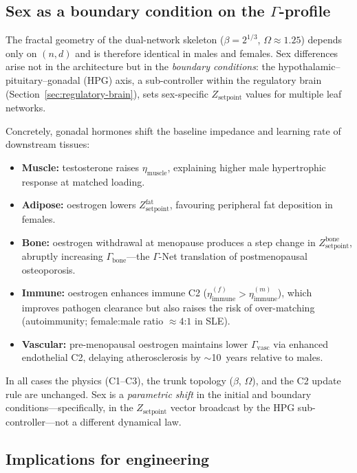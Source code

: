 \documentclass[aps,pre,twocolumn,superscriptaddress,floatfix]{revtex4-2}
\begin{document}
\subsection{Sex as a boundary condition on the
$\Gamma$-profile}

The fractal geometry of the dual-network skeleton
($\beta = 2^{1/3}$, $\Omega \approx 1.25$) depends only
on $(n, d)$ and is therefore identical in males and females.
Sex differences arise not in the architecture but in the
\emph{boundary conditions}: the hypothalamic--pituitary--gonadal
(HPG) axis, a sub-controller within the regulatory brain
(Section~\ref{sec:regulatory-brain}), sets sex-specific
$Z_{\text{setpoint}}$ values for multiple leaf networks.

Concretely, gonadal hormones shift the baseline impedance
and learning rate of downstream tissues:
\begin{itemize}
  \item \textbf{Muscle:} testosterone raises
    $\eta_{\text{muscle}}$, explaining higher male
    hypertrophic response at matched loading.
  \item \textbf{Adipose:} oestrogen lowers
    $Z_{\text{setpoint}}^{\text{fat}}$, favouring
    peripheral fat deposition in females.
  \item \textbf{Bone:} oestrogen withdrawal at menopause
    produces a step change in $Z_{\text{setpoint}}^{\text{bone}}$,
    abruptly increasing $\Gamma_{\text{bone}}$---the
    $\Gamma$-Net translation of postmenopausal osteoporosis.
  \item \textbf{Immune:} oestrogen enhances immune C2
    ($\eta_{\text{immune}}^{(f)} > \eta_{\text{immune}}^{(m)}$),
    which improves pathogen clearance but also raises the
    risk of over-matching (autoimmunity; female:male ratio
    $\approx 4$:$1$ in SLE).
  \item \textbf{Vascular:} pre-menopausal oestrogen
    maintains lower $\Gamma_{\text{vasc}}$ via enhanced
    endothelial C2, delaying atherosclerosis by
    $\sim$10~years relative to males.
\end{itemize}
In all cases the physics (C1--C3), the trunk topology
($\beta$, $\Omega$), and the C2 update rule are
unchanged.  Sex is a \emph{parametric shift} in the
initial and boundary conditions---specifically, in the
$Z_{\text{setpoint}}$ vector broadcast by the HPG
sub-controller---not a different dynamical law.

\subsection{Implications for engineering}
\end{document}
